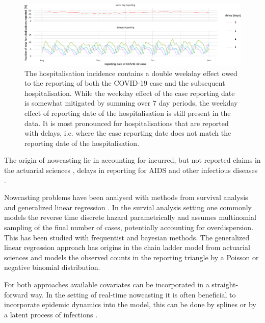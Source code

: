 \begin{figure}

    {\centering \includegraphics[width=\textwidth]{figures_tentative/double_weekday_effect-1} 

}

\caption{The hospitalisation incidence contains a double weekday effect owed to the reporting of both the COVID-19 case and the subsequent hospitalisation. While the weekday effect of the case reporting date is somewhat mitigated by summing over $7$ day periods, the weekday effect of reporting date of the hospitalisation is still present in the data. It is most pronounced for hospitalisations that are reported with delays, i.e. where the case reporting date does not match the reporting date of the hospitalisation.}\label{fig:double_weekday_effect}
\end{figure}

The origin of nowcasting lie in accounting for incurred, but not
reported claims in the actuarial sciences
\cite{Kaminsky1987Prediction}, delays in reporting for AIDS
\cite{Zeger1989Statistical,Lawless1994Adjustments} and other
infectious diseases \cite{Farrington1996Statistical}.

Nowcasting problems have been analysed with methods from survival
analysis \cite{Lawless1994Adjustments} and generalized linear
regression \cite{Zeger1989Statistical}. In the survial analysis
setting one commonly models the reverse time discrete hazard
parametrically and assumes multinomial sampling of the final number of
cases, potentially accounting for overdispersion. This has been studied
with frequentist \cite{Midthune2005Modeling} and bayesian
\cite{Hohle2014Bayesian,AnDerHeiden2020Schatzung} methods. The
generalized linear regression approach has origins in the chain ladder
model from actuarial sciences \cite{Renshaw1998Stochastic} and
models the observed counts in the reporting triangle by a Poisson or
negative binomial distribution.

For both approaches available covariates can be incorporated in a
straight-forward way. In the setting of real-time nowcasting it is often
beneficial to incorporate epidemic dynamics into the model, this can be
done by splines
\cite{Hohle2014Bayesian,vandeKassteele2019Nowcasting} or by a latent
process of infections \cite{McGough2020Nowcasting}.

